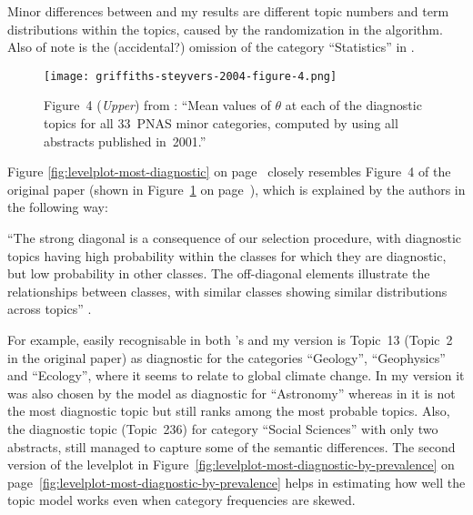 Minor differences between  and my results are different topic numbers and term distributions within the topics, caused by the randomization in the algorithm. Also of note is the (accidental?) omission of the category ``Statistics'' in .

\begin{figure}[htbp]
\begin{center}
\texttt{[image: griffiths-steyvers-2004-figure-4.png]} %
\caption{Figure~4 (\emph{Upper}) from : ``Mean values of $\theta$ at each of the diagnostic topics for all 33~PNAS minor categories, computed by using all abstracts published in~2001.''}
\label{fig:griffiths-steyvers-2004-figure-4}
\end{center}
\end{figure}


Figure \ref{fig:levelplot-most-diagnostic} on page~\pageref{fig:levelplot-most-diagnostic} closely resembles Figure~4 of the original paper (shown in Figure~\ref{fig:griffiths-steyvers-2004-figure-4} on page~\pageref{fig:griffiths-steyvers-2004-figure-4}), which is explained by the authors in the following way:

``The strong diagonal is a consequence of our selection procedure, with diagnostic topics having high probability within the classes for which they are diagnostic, but low probability in other classes. The off-diagonal elements illustrate the relationships between classes, with similar classes showing similar distributions across topics'' \citep[p.~5232]{Griffiths2004}.

For example, easily recognisable in both 's and my version is Topic~13 (Topic~2 in the original paper) as diagnostic for the categories ``Geology'', ``Geophysics'' and ``Ecology'', where it seems to relate to global climate change. In my version it was also chosen by the model as diagnostic for ``Astronomy'' whereas in  it is not the most diagnostic topic but still ranks among the most probable topics. Also, the diagnostic topic (Topic~236) for category ``Social Sciences'' with only two abstracts, still managed to capture some of the semantic differences.
The second version of the levelplot in Figure~\ref{fig:levelplot-most-diagnostic-by-prevalence} on page~\ref{fig:levelplot-most-diagnostic-by-prevalence} helps in estimating how well the topic model works even when category frequencies are skewed.

